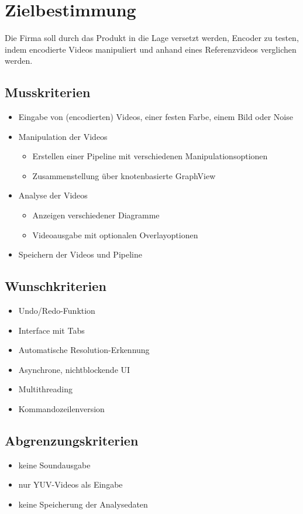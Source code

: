 \section{Zielbestimmung}

Die Firma soll durch das Produkt in die Lage versetzt werden, Encoder zu testen, indem encodierte Videos manipuliert und anhand eines Referenzvideos verglichen werden.

\subsection{Musskriterien}

\begin{itemize}
	\item Eingabe von (encodierten) Videos, einer festen Farbe, einem Bild oder Noise
	\item Manipulation der Videos
	\begin{itemize}
		\item Erstellen einer Pipeline mit verschiedenen Manipulationsoptionen
		\item Zusammenstellung über knotenbasierte GraphView
	\end{itemize}
	\item Analyse der Videos
	\begin{itemize}
		\item Anzeigen verschiedener Diagramme
		\item Videoausgabe mit optionalen Overlayoptionen
	\end{itemize}
	\item Speichern der Videos und Pipeline
\end{itemize}

\subsection{Wunschkriterien}

\begin{itemize}
	\item Undo/Redo-Funktion
	\item Interface mit Tabs
	\item Automatische Resolution-Erkennung
	\item Asynchrone, nichtblockende UI
	\item Multithreading
	\item Kommandozeilenversion
\end{itemize}

\subsection{Abgrenzungskriterien}

\begin{itemize}
	\item keine Soundausgabe
	\item nur YUV-Videos als Eingabe
	\item keine Speicherung der Analysedaten
\end{itemize}
